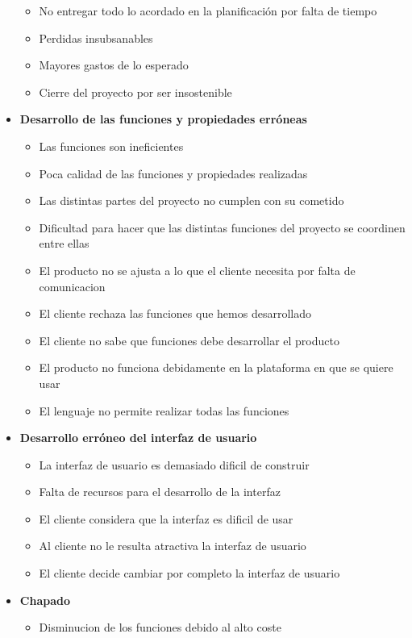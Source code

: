 \documentclass[spanish,a4paper,12pt]{report}	%
\begin{document}
\begin{itemize}
\begin{itemize}
		\item {No entregar todo lo acordado en la planificación por falta de tiempo}
		\item {Perdidas insubsanables}
		\item {Mayores gastos de lo esperado}
		\item {Cierre del proyecto por ser insostenible}
	\end{itemize}
\item \textbf {Desarrollo de las funciones y propiedades erróneas}
	\begin{itemize}
		\item {Las funciones son ineficientes}
		\item {Poca calidad de las funciones y propiedades realizadas}
		\item {Las distintas partes del proyecto no cumplen con su cometido}
		\item {Dificultad para hacer que las distintas funciones del proyecto se coordinen entre ellas}
		\item {El producto no se ajusta a lo que el cliente necesita por falta de comunicacion}
		\item {El cliente rechaza las funciones que hemos desarrollado}
		\item {El cliente no sabe que funciones debe desarrollar el producto}
		\item {El producto no funciona debidamente en la plataforma en que se quiere usar}
		\item {El lenguaje no permite realizar todas las funciones}
	\end{itemize}
\item \textbf {Desarrollo erróneo del interfaz de usuario}
	\begin{itemize}
		\item {La interfaz de usuario es demasiado dificil de construir}
		\item {Falta de recursos para el desarrollo de la interfaz}
		\item {El cliente considera que la interfaz es dificil de usar}
		\item {Al cliente no le resulta atractiva la interfaz de usuario}
		\item {El cliente decide cambiar por completo la interfaz de usuario}
	\end{itemize}
\item \textbf {Chapado}
	\begin{itemize}
		\item {Disminucion de los funciones debido al alto coste}

\end{itemize}
\end{itemize}
\end{document}
